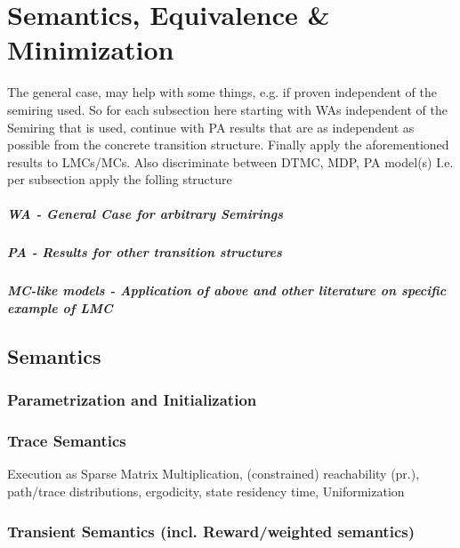 \chapter{Semantics, Equivalence \& Minimization}\label{\positionnumber}  
        The general case, may help with some things, e.g. if proven independent of the semiring used. So for each subsection here starting with WAs independent of the Semiring that is used, continue with PA results that are as independent as possible from the concrete transition structure. Finally apply the aforementioned results to LMCs/MCs. Also discriminate between DTMC, MDP, PA model(s) I.e. per subsection apply the folling structure
        
            \paragraph{WA - General Case for arbitrary Semirings}
            
            \paragraph{PA - Results for other transition structures}
            
            \paragraph{MC-like models - Application of above and other literature on specific example of LMC}


    \section{Semantics}
        \subsection{Parametrization and Initialization}
    
        \subsection{Trace Semantics}
            Execution as Sparse Matrix Multiplication, 
            (constrained) reachability (pr.), path/trace distributions,
            ergodicity, state residency time, Uniformization
            
        
        
        \subsection{Transient Semantics (incl. Reward/weighted semantics)}
            
